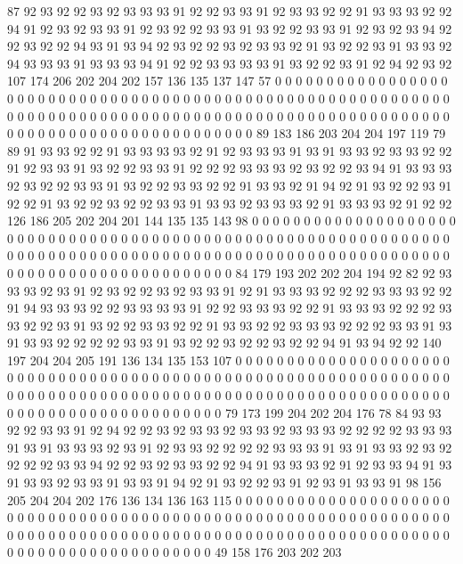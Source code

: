 87 92 93 92 92 93 92 93 93 93 91 92 92 93 93 91 92 93 93 92
92 91 93 93 93 92 92 94 91 92 93 92 93 93 91 92 93 92 92 93
93 91 93 92 92 93 93 91 92 93 92 93 94 92 92 93 92 92 94 93
91 93 94 92 93 92 92 93 92 93 93 92 91 93 92 92 93 91 93 93
92 94 93 93 93 91 93 93 93 94 91 92 92 93 93 93 93 91 93 92
92 93 91 92 94 92 93 92 107 174 206 202 204 202 157 136 135 137 147 57
0 0 0 0 0 0 0 0 0 0 0 0 0 0 0 0 0 0 0 0
0 0 0 0 0 0 0 0 0 0 0 0 0 0 0 0 0 0 0 0
0 0 0 0 0 0 0 0 0 0 0 0 0 0 0 0 0 0 0 0
0 0 0 0 0 0 0 0 0 0 0 0 0 0 0 0 0 0 0 0
0 0 0 0 0 0 0 0 0 0 0 0 0 0 0 0 0 0 0 0
0 0 0 0 0 0 0 0 0 0 0 0 0 0 0 0 0 0 0 0
0 0 0 0 0 0 0 89 183 186 203 204 204 197 119 79 89 91 93 93
92 92 91 93 93 93 93 92 91 92 93 93 93 91 93 91 93 93 92 93
93 92 92 91 92 93 93 91 93 92 92 93 93 91 92 92 92 93 93 93
92 93 92 92 93 94 91 93 93 93 92 93 92 92 93 93 91 93 92 92
93 93 92 92 91 93 93 92 91 94 92 91 93 92 92 93 91 92 92 91
93 92 92 93 92 92 93 93 91 93 93 92 93 93 93 92 91 93 93 93
92 91 92 92 126 186 205 202 204 201 144 135 135 143 98 0 0 0 0 0
0 0 0 0 0 0 0 0 0 0 0 0 0 0 0 0 0 0 0 0
0 0 0 0 0 0 0 0 0 0 0 0 0 0 0 0 0 0 0 0
0 0 0 0 0 0 0 0 0 0 0 0 0 0 0 0 0 0 0 0
0 0 0 0 0 0 0 0 0 0 0 0 0 0 0 0 0 0 0 0
0 0 0 0 0 0 0 0 0 0 0 0 0 0 0 0 0 0 0 0
0 0 0 0 0 0 0 0 0 0 0 0 0 0 0 0 0 0 0 0
0 0 0 84 179 193 202 202 204 194 92 82 92 93 93 93 92 93 91 92
93 92 92 93 92 93 93 91 92 91 93 93 93 92 92 92 93 93 93 92
92 91 94 93 93 93 92 92 93 93 93 93 91 92 92 93 93 93 92 92
91 93 93 93 92 92 92 93 93 92 92 93 91 93 92 92 93 93 92 92
91 93 93 92 92 93 93 93 92 92 92 93 93 91 93 91 93 93 92 92
92 92 93 93 91 93 92 92 93 92 92 93 92 92 94 91 93 94 92 92
140 197 204 204 205 191 136 134 135 153 107 0 0 0 0 0 0 0 0 0
0 0 0 0 0 0 0 0 0 0 0 0 0 0 0 0 0 0 0 0
0 0 0 0 0 0 0 0 0 0 0 0 0 0 0 0 0 0 0 0
0 0 0 0 0 0 0 0 0 0 0 0 0 0 0 0 0 0 0 0
0 0 0 0 0 0 0 0 0 0 0 0 0 0 0 0 0 0 0 0
0 0 0 0 0 0 0 0 0 0 0 0 0 0 0 0 0 0 0 0
0 0 0 0 0 0 0 0 0 0 0 0 0 0 0 0 0 0 0 79
173 199 204 202 204 176 78 84 93 93 92 92 93 93 91 92 94 92 92 93
92 93 93 92 93 93 92 93 93 93 92 92 92 92 93 93 93 91 93 91
93 93 93 92 93 91 92 93 93 92 92 92 92 93 93 93 91 93 91 93
93 92 93 92 92 92 92 93 93 94 92 92 93 92 93 93 92 92 94 91
93 93 93 92 91 92 93 93 94 91 93 91 93 93 92 93 93 91 93 93
91 94 92 91 93 92 92 93 91 92 93 91 93 93 91 98 156 205 204 204
202 176 136 134 136 163 115 0 0 0 0 0 0 0 0 0 0 0 0 0
0 0 0 0 0 0 0 0 0 0 0 0 0 0 0 0 0 0 0 0
0 0 0 0 0 0 0 0 0 0 0 0 0 0 0 0 0 0 0 0
0 0 0 0 0 0 0 0 0 0 0 0 0 0 0 0 0 0 0 0
0 0 0 0 0 0 0 0 0 0 0 0 0 0 0 0 0 0 0 0
0 0 0 0 0 0 0 0 0 0 0 0 0 0 0 0 0 0 0 0
0 0 0 0 0 0 0 0 0 0 0 0 0 0 49 158 176 203 202 203
